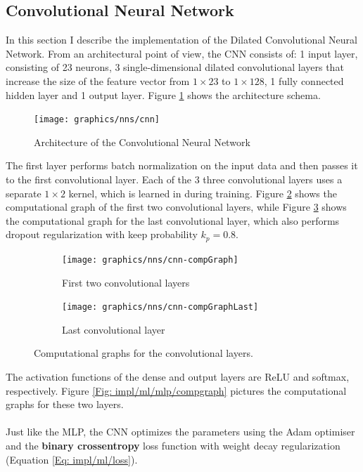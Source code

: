 	\subsection{Convolutional Neural Network} \label{Section: impl/ml/cnn}
	In this section I describe the implementation of the Dilated Convolutional Neural Network. From an architectural point of view, the CNN consists of: 1 input layer, consisting of 23 neurons, 3 single-dimensional dilated convolutional layers that increase the size of the feature vector from $1\times23$ to $1\times128$, 1 fully connected hidden layer and 1 output layer. Figure \ref{Fig: impl/ml/cnn/architecture} shows the architecture schema. 
	\begin{figure}[H]
		\centering
		\texttt{[image: graphics/nns/cnn]}
		\caption{Architecture of the Convolutional Neural Network}
		\label{Fig: impl/ml/cnn/architecture}
	\end{figure}
	The first layer performs batch normalization on the input data and then passes it to the first convolutional layer. Each of the 3 three convolutional layers uses a separate $1\times2$ kernel, which is learned in during training. Figure \ref{Fig: impl/ml/cnn/compGraph} shows the computational graph of the first two convolutional layers, while Figure \ref{Fig: impl/ml/cnn/compGraphLast} shows the computational graph for the last convolutional layer, which also performs dropout regularization with keep probability $k_p = 0.8$.
	\begin{figure}[H]
		\centering
		\begin{subfigure}[b]{.4\textwidth}
			\centering
			\texttt{[image: graphics/nns/cnn-compGraph]}
			\caption{First two convolutional layers}
			\label{Fig: impl/ml/cnn/compGraph}
		\end{subfigure}
		\hfill
		\begin{subfigure}[b]{.4\textwidth}
			\centering
			\texttt{[image: graphics/nns/cnn-compGraphLast]}
			\caption{Last convolutional layer}
			\label{Fig: impl/ml/cnn/compGraphLast}
		\end{subfigure}
		\caption{Computational graphs for the convolutional layers.}
		\label{Fig: impl/ml/cnn/compGraphs}
	\end{figure}
	The activation functions of the dense and output layers are ReLU and softmax, respectively. Figure \ref{Fig: impl/ml/mlp/compgraph} pictures the computational graphs for these two layers. 
	\\ \\
	Just like the MLP, the CNN optimizes the parameters using the Adam optimiser and the \textbf{binary crossentropy} loss function with weight decay regularization (Equation \ref{Eq: impl/ml/loss}).
 
